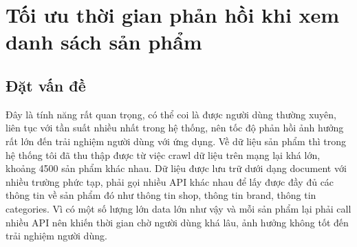 \documentclass[../DoAn.tex]{subfiles}
\begin{document}



\section{Tối ưu thời gian phản hồi khi xem danh sách sản phẩm}
\subsection{Đặt vấn đề}
Đây là tính năng rất quan trọng, có thể coi là được người dùng thường xuyên, liên tục với tần suất nhiều nhất trong hệ thống, nên tốc độ phản hồi ảnh hưởng rất lớn đến trải nghiệm người dùng với ứng dụng. Về dữ liệu sản phẩm thì trong hệ thống tôi đã thu thập được từ việc crawl dữ liệu trên mạng lại khá lớn, khoảng 4500 sản phẩm khác nhau. Dữ liệu được lưu trữ dưới dạng document với nhiều trường phức tạp, phải gọi nhiều API khác nhau để lấy được đầy đủ các thông tin về sản phẩm đó như thông tin shop, thông tin brand, thông tin categories. Vì có một số lượng lớn data lớn như vậy và mỗi sản phẩm lại phải call nhiều API nên khiến thời gian chờ người dùng khá lâu, ảnh hưởng không tốt đến trải nghiệm người dùng. 
\end{document}
